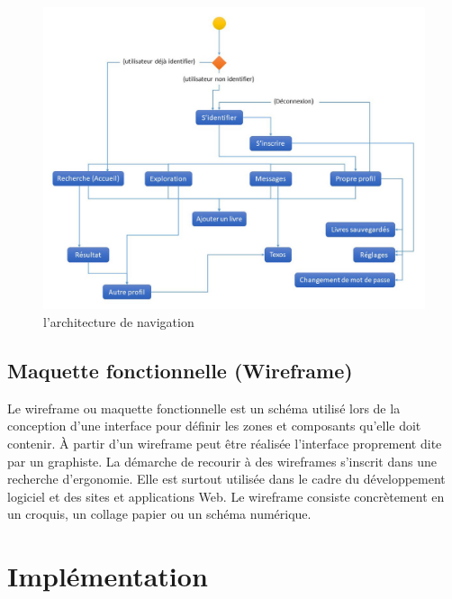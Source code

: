 \begin{figure}[h]
	\begin{center}
		\includegraphics[width=14cm]{Images/chapter3/diagramme_de_navigation.jpg}
		\caption{{\footnotesize l'architecture de navigation}}
	\end{center}
\end{figure}

\subsection{Maquette fonctionnelle (Wireframe)}
Le wireframe ou maquette fonctionnelle est un schéma utilisé lors de la conception d'une interface pour définir les zones et composants qu'elle doit contenir. À partir d'un wireframe peut être réalisée l'interface proprement dite par un graphiste. La démarche de recourir à des wireframes s'inscrit dans une recherche d'ergonomie. Elle est surtout utilisée dans le cadre du développement logiciel et des sites et applications Web. Le wireframe consiste concrètement en un croquis, un collage papier ou un schéma numérique\cite{noauthor_wireframe_nodate}.




\section{Implémentation}
